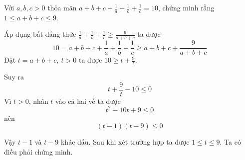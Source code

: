 \begin{problem}

Với $a, b, c > 0$ thỏa mãn $\displaystyle a + b + c + \frac{1}{a} + \frac{1}{b} + \frac{1}{c} = 10$,
chứng minh rằng $1 \le a + b + c \le 9$.
\solution

Áp dụng bất đẳng thức $\displaystyle \frac{1}{a} + \frac{1}{b} + \frac{1}{c} \ge \frac{9}{a + b + c}$ ta được
$$
	10 = a + b + c + \frac{1}{a} + \frac{1}{b} + \frac{1}{c} \ge a + b + c + \frac{9}{a + b + c}
$$
Đặt $t = a + b + c,\ t > 0$ ta được $\displaystyle 10 \ge t + \frac{9}{t}$.

Suy ra
$$
	t + \frac{9}{t} - 10 \le 0
$$
Vì $t > 0$, nhân $t$ vào cả hai vế ta được
$$
	t^2 - 10t + 9 \le 0
$$
nên
$$
	(t - 1)(t - 9) \le 0
$$

Vậy $t - 1$ và $t - 9$ khác dấu. Sau khi xét trường hợp ta được $1 \le t \le 9$.
Ta có điều phải chứng minh.

\end{problem}